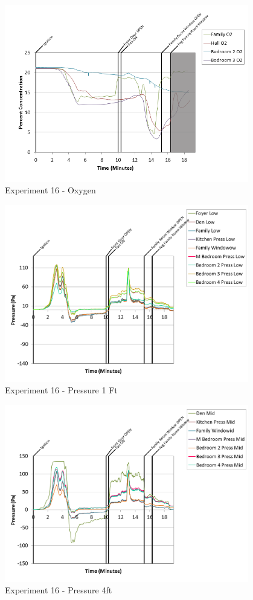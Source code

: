 \documentclass{article}
\begin{document}
\begin{appendices}
\begin{figure}[h!]
	\centering
	\includegraphics[height=3.05in]{0_Images/Results_Charts/Exp_16_Charts/Oxygen.png}
	\caption{Experiment 16 - Oxygen}
\end{figure}

\clearpage

\begin{figure}[h!]
	\centering
	\includegraphics[height=3.05in]{0_Images/Results_Charts/Exp_16_Charts/Pressure1Ft.png}
	\caption{Experiment 16 - Pressure 1 Ft}
\end{figure}


\begin{figure}[h!]
	\centering
	\includegraphics[height=3.05in]{0_Images/Results_Charts/Exp_16_Charts/Pressure4ft.png}
	\caption{Experiment 16 - Pressure 4ft}
\end{figure}


\end{appendices}
\end{document}
